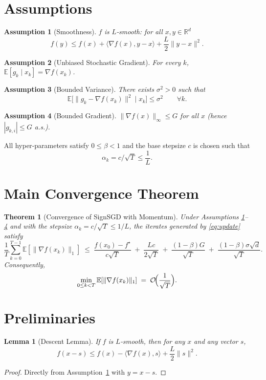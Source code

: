\documentclass{article}
\newtheorem{theorem}{Theorem}
\newtheorem{lemma}{Lemma}
\newtheorem{assumption}{Assumption}
\newcommand{\E}{\mathbb{E}}
\newcommand{\R}{\mathbb{R}}
\begin{document}
\section*{Assumptions}
\begin{assumption}[Smoothness]\label{as:smooth}
$f$ is $L$‑smooth: for all $x,y\in\R^{d}$
\[
f(y)\le f(x)+\langle \nabla f(x),y-x\rangle+\frac{L}{2}\|y-x\|^{2}.
\]
\end{assumption}
\begin{assumption}[Unbiased Stochastic Gradient]\label{as:unbiased}
For every $k$, $\E[g_{k}\mid x_{k}]=\nabla f(x_{k})$.
\end{assumption}
\begin{assumption}[Bounded Variance]\label{as:variance}
There exists $\sigma^{2}>0$ such that
\[
\E\bigl[\|g_{k}-\nabla f(x_{k})\|^{2}\mid x_{k}\bigr]\le\sigma^{2}\qquad\forall k.
\]
\end{assumption}
\begin{assumption}[Bounded Gradient]\label{as:bounded}
$\|\nabla f(x)\|_{\infty}\le G$ for all $x$ (hence $|g_{k,i}|\le G$ a.s.).
\end{assumption}
All hyper‑parameters satisfy $0\le\beta<1$ and the base stepsize $c$ is chosen such that
\[
\alpha_{k}=c/\sqrt{T}\le \frac{1}{L}.
\]

\section*{Main Convergence Theorem}
\begin{theorem}[Convergence of SignSGD with Momentum]\label{thm:main}
Under Assumptions \ref{as:smooth}–\ref{as:bounded} and with the stepsize $\alpha_{k}=c/\sqrt{T}\le 1/L$, the iterates generated by \eqref{eq:update} satisfy
\[
\frac{1}{T}\sum_{k=0}^{T-1}\E\!\left[\|\nabla f(x_{k})\|_{1}\right]
\;\le\;
\frac{f(x_{0})-f^{\star}}{c\sqrt{T}}
\;+\;
\frac{Lc}{2\sqrt{T}}
\;+\;
\frac{(1-\beta)G}{\sqrt{T}}\;+\;
\frac{(1-\beta)\sigma\sqrt{d}}{\sqrt{T}} .
\tag{A}
\]
Consequently,
\[
\min_{0\le k<T}\E\!\left[\|\nabla f(x_{k})\|_{1}\right]
\;=\;
\mathcal{O}\!\Bigl(\frac{1}{\sqrt{T}}\Bigr).
\]
\end{theorem}

\section*{Preliminaries}
\begin{lemma}[Descent Lemma]\label{lem:descent}
If $f$ is $L$‑smooth, then for any $x$ and any vector $s$,
\[
f(x-s)\le f(x)-\langle \nabla f(x),s\rangle+\frac{L}{2}\|s\|^{2}.
\]
\end{lemma}
\begin{proof}
Directly from Assumption~\ref{as:smooth} with $y=x-s$.
\end{proof}
\end{document}
